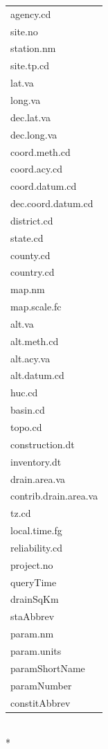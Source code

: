 \documentclass[a4paper,11pt]{article}
\begin{document}
\begin{tabular}{l}
  \hline
  \hline
agency.cd \\ 
  site.no \\ 
  station.nm \\ 
  site.tp.cd \\ 
  lat.va \\ 
  long.va \\ 
  dec.lat.va \\ 
  dec.long.va \\ 
  coord.meth.cd \\ 
  coord.acy.cd \\ 
  coord.datum.cd \\ 
  dec.coord.datum.cd \\ 
  district.cd \\ 
  state.cd \\ 
  county.cd \\ 
  country.cd \\ 
  map.nm \\ 
  map.scale.fc \\ 
  alt.va \\ 
  alt.meth.cd \\ 
  alt.acy.va \\ 
  alt.datum.cd \\ 
  huc.cd \\ 
  basin.cd \\ 
  topo.cd \\ 
  construction.dt \\ 
  inventory.dt \\ 
  drain.area.va \\ 
  contrib.drain.area.va \\ 
  tz.cd \\ 
  local.time.fg \\ 
  reliability.cd \\ 
  project.no \\ 
  queryTime \\ 
  drainSqKm \\ 
  staAbbrev \\ 
  param.nm \\ 
  param.units \\ 
  paramShortName \\ 
  paramNumber \\ 
  constitAbbrev \\ 
   \hline
\end{tabular}
\\*
\end{document}

